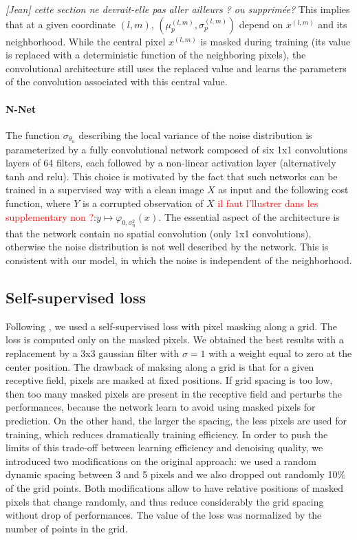\documentclass{article}
\begin{document}
\textit{[Jean] cette section ne devrait-elle pas aller ailleurs ? ou supprimée?}
This implies that at a given coordinate $(l,m)$, $(\mu_p^{(l,m)}, \sigma_p^{(l,m)})$ depend on $x^{(l,m)}$ and its neighborhood.
While the central pixel $x^{(l,m)}$ is masked during training (its value is replaced with a deterministic function of the neighboring pixels), the convolutional architecture still uses the replaced value and learns the parameters of the convolution associated with this central value.

\paragraph{N-Net}
The function $\sigma_{\theta_n}$ describing the local variance of the noise distribution is parameterized by a fully convolutional network composed of six 1x1 convolutions layers of 64 filters, each followed by a non-linear activation layer (alternatively tanh and relu).
This choice is motivated by the fact that such networks can be trained in a supervised way with a clean image $X$ as input and the following cost function, where $Y$ is a corrupted observation of $X$ \textcolor{red}{il faut l'llustrer dans les supplementary non ?}:$y\mapsto\varphi_{0,\sigma_n^2}(x)$.
The essential aspect of the architecture is that the network contain no spatial convolution (only 1x1 convolutions), otherwise the noise distribution is not well described by the network. This is consistent with our model, in which the noise is independent of the neighborhood.

\subsection{Self-supervised loss}
Following \cite{batson2019noise2self}, we used a self-supervised loss with pixel masking along a grid. The loss is computed only on the masked pixels.
We obtained the best results with a replacement by a 3x3 gaussian filter with $\sigma=1$ with a weight equal to zero at the center position.
The drawback of maksing along a grid is that for a given receptive field, pixels are masked at fixed positions. If grid spacing is too low, then too many masked pixels are present in the receptive field and perturbs the performances, because the network learn to avoid using masked pixels for prediction. On the other hand, the larger the spacing, the less pixels are used for training, which reduces dramatically training efficiency.
In order to push the limits of this trade-off between learning efficiency and denoising quality, we introduced two modifications on the original approach: we used a random dynamic spacing between 3 and 5 pixels and we also dropped out randomly 10\% of the grid points. Both modifications allow to have relative positions of masked pixels that change randomly, and thus reduce considerably the grid spacing without drop of performances. The value of the loss was normalized by the number of points in the grid.
\end{document}
